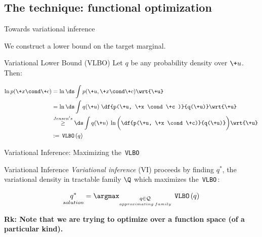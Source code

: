 \documentclass[10pt]{beamer}
\newcommand{\VLBO}{\,\texttt{VLBO}\,}
\begin{document}
%

\subsection{The technique: functional optimization}
\begin{frame}{Towards variational inference}
 

We construct a lower bound on the target marginal. 



\begin{block}{Variational Lower Bound (VLBO)}
Let $q$ be any probability density over $\+u$. Then:

\begin{align*}
\ln p(\+x \cond \+c) & = \ln \ds\int  p(\+u, \+x  \cond \+c) \wrt{\+u}  \\ 
& = \ln \ds\int  q(\+u) \; \df{p(\+u, \+x  \cond \+c )}{q(\+u)} \wrt{\+u}  \\ 
& \stackrel{Jensen's}{\geq} \ds\int  q(\+u) \; \ln \bigg( \df{p(\+u, \+x  \cond \+c)}{q(\+u)} \bigg) \wrt{\+u} \\
& : = \VLBO(q) 
\end{align*}
\end{block} 

 


\end{frame} 
%
%
\begin{frame}{Variational Inference: Maximizing the 
\VLBO}


\begin{block}{Variational Inference}
\textit{Variational inference} (VI) proceeds by finding $q^*$, the variational density in tractable family $\Q$ which maximizes the \VLBO :

\[ \underset{solution}{q^*} = \argmax_{\underset{approximating \; family}{q \in \mathcal{Q}}} \; \VLBO ( q) \]
\end{block} 


\vfill \vfill
\tiny \bf{Rk:} Note that we are trying to optimize over a function space (of a particular kind).  
\end{frame} 
\end{document}

